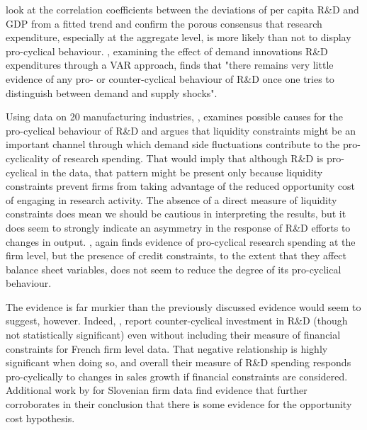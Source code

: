 \documentclass{_latex/house}
\begin{document}
\cite{RePEc:eee:ecolet:v:82:y:2004:i:1:p:91-97} look at the correlation coefficients between the deviations of per capita R\&D and GDP from a fitted trend and confirm the porous consensus that research expenditure, especially at the aggregate level, is more likely than not to display pro-cyclical behaviour. \cite{SaintPaul1993861}, examining the effect of demand innovations R\&D expenditures through a VAR approach, finds that "there remains very little evidence of any pro- or counter-cyclical behaviour of R\&D once one tries to distinguish between demand and supply shocks".

Using data on 20 manufacturing industries, \cite{RePEc:tpr:restat:v:93:y:2011:i:2:p:542-553}, examines possible causes for the pro-cyclical behaviour of R\&D and argues that liquidity constraints might be an important channel through which demand side fluctuations contribute to the pro-cyclicality of research spending. That would imply that although R\&D is pro-cyclical in the data, that pattern might be present only because liquidity constraints prevent firms from taking advantage of the reduced opportunity cost of engaging in research activity. The absence of a direct measure of liquidity constraints does mean we should be cautious in interpreting the results, but it does seem to strongly indicate an asymmetry in the response of R\&D efforts to changes in output. \cite{RePEc:aea:aecrev:v:97:y:2007:i:4:p:1131-1164}, again finds evidence of pro-cyclical research spending at the firm level, but the presence of credit constraints, to the extent that they affect balance sheet variables, does not seem to reduce the degree of its pro-cyclical behaviour.
 
The evidence is far murkier than the previously discussed evidence would seem to suggest, however. Indeed,  \cite{JEEA:JEEA1093}, report counter-cyclical investment in R\&D (though not statistically significant) even without including their measure of financial constraints for French firm level data. That negative relationship is highly significant when doing so, and overall their measure of R\&D spending responds pro-cyclically to changes in sales growth if financial constraints are considered. Additional work by \cite{RePEc:lic:licosd:23909} for Slovenian firm data find evidence that further corroborates \cite{JEEA:JEEA1093} in their conclusion that there is some evidence for the opportunity cost hypothesis.
\end{document}
